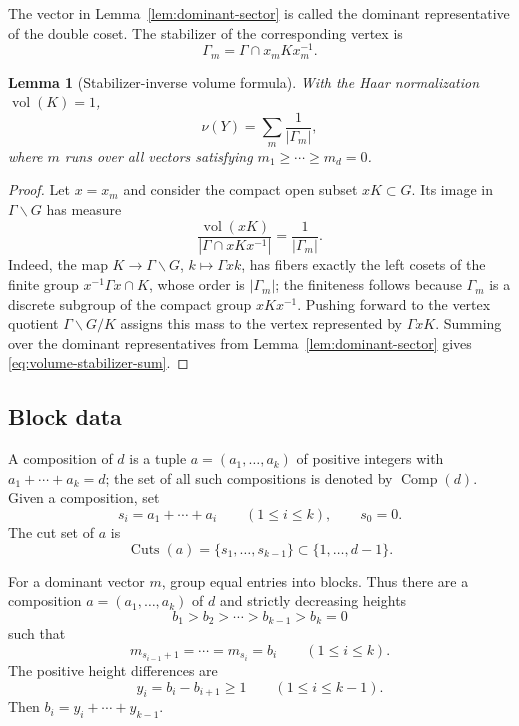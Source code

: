 \documentclass[11pt]{amsart}
\newcommand{\vol}{\operatorname{vol}}
\newcommand{\Comp}{\operatorname{Comp}}
\newcommand{\Cuts}{\operatorname{Cuts}}
\theoremstyle{plain}
\newtheorem{lemma}[theorem]{Lemma}
\theoremstyle{definition}
\numberwithin{equation}{section}
\begin{document}
The vector in Lemma~\ref{lem:dominant-sector} is called the dominant representative of the
double coset.  The stabilizer of the corresponding vertex is
\begin{equation}\label{eq:Gamma-m}
  \Gamma_m=\Gamma\cap x_mKx_m^{-1}.
\end{equation}

\begin{lemma}[Stabilizer-inverse volume formula]\label{lem:orbit-stabilizer-volume}
With the Haar normalization $\vol(K)=1$,
\begin{equation}\label{eq:volume-stabilizer-sum}
  \nu(Y)=\sum_m\frac1{|\Gamma_m|},
\end{equation}
where $m$ runs over all vectors satisfying $m_1\ge\cdots\ge m_d=0$.
\end{lemma}

\begin{proof}
Let $x=x_m$ and consider the compact open subset $xK\subset G$.  Its image in
$\Gamma\backslash G$ has measure
\[
  \frac{\vol(xK)}{|\Gamma\cap xKx^{-1}|}=\frac{1}{|\Gamma_m|}.
\]
Indeed, the map $K\to\Gamma\backslash G$, $k\mapsto\Gamma xk$, has fibers exactly the
left cosets of the finite group $x^{-1}\Gamma x\cap K$, whose order is $|\Gamma_m|$; the
finiteness follows because $\Gamma_m$ is a discrete subgroup of the compact group
$xKx^{-1}$.  Pushing forward to the vertex quotient $\Gamma\backslash G/K$ assigns this
mass to the vertex represented by $\Gamma xK$.  Summing over the dominant representatives
from Lemma~\ref{lem:dominant-sector} gives \eqref{eq:volume-stabilizer-sum}.
\end{proof}

\subsection{Block data}

A composition of $d$ is a tuple $a=(a_1,\ldots,a_k)$ of positive integers with
$a_1+\cdots+a_k=d$; the set of all such compositions is denoted by $\Comp(d)$.  Given a
composition, set
\[
  s_i=a_1+\cdots+a_i\qquad (1\le i\le k),\qquad s_0=0.
\]
The cut set of $a$ is
\[
  \Cuts(a)=\{s_1,\ldots,s_{k-1}\}\subset\{1,\ldots,d-1\}.
\]

For a dominant vector $m$, group equal entries into blocks.  Thus there are a composition
$a=(a_1,\ldots,a_k)$ of $d$ and strictly decreasing heights
\[
  b_1>b_2>\cdots>b_{k-1}>b_k=0
\]
such that
\[
  m_{s_{i-1}+1}=\cdots=m_{s_i}=b_i\qquad (1\le i\le k).
\]
The positive height differences are
\begin{equation}\label{eq:y-differences}
  y_i=b_i-b_{i+1}\ge1\qquad (1\le i\le k-1).
\end{equation}
Then $b_i=y_i+\cdots+y_{k-1}$.
\end{document}
